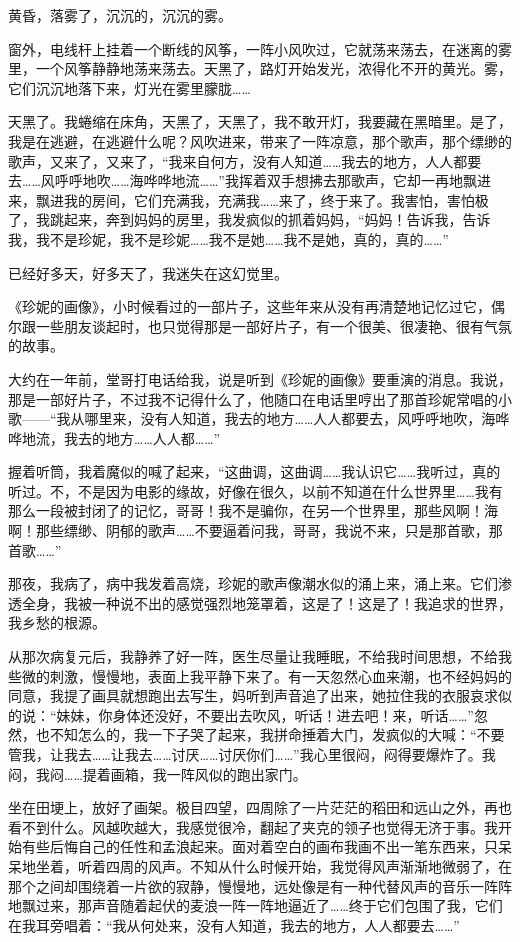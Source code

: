 \par 黄昏，落雾了，沉沉的，沉沉的雾。
\par 窗外，电线杆上挂着一个断线的风筝，一阵小风吹过，它就荡来荡去，在迷离的雾里，一个风筝静静地荡来荡去。天黑了，路灯开始发光，浓得化不开的黄光。雾，它们沉沉地落下来，灯光在雾里朦胧……
\par 天黑了。我蜷缩在床角，天黑了，天黑了，我不敢开灯，我要藏在黑暗里。是了，我是在逃避，在逃避什么呢？风吹进来，带来了一阵凉意，那个歌声，那个缥缈的歌声，又来了，又来了，“我来自何方，没有人知道……我去的地方，人人都要去……风呼呼地吹……海哗哗地流……”我挥着双手想拂去那歌声，它却一再地飘进来，飘进我的房间，它们充满我，充满我……来了，终于来了。我害怕，害怕极了，我跳起来，奔到妈妈的房里，我发疯似的抓着妈妈，“妈妈！告诉我，告诉我，我不是珍妮，我不是珍妮……我不是她……我不是她，真的，真的……”
\par 已经好多天，好多天了，我迷失在这幻觉里。
\par 《珍妮的画像》，小时候看过的一部片子，这些年来从没有再清楚地记忆过它，偶尔跟一些朋友谈起时，也只觉得那是一部好片子，有一个很美、很凄艳、很有气氛的故事。
\par 大约在一年前，堂哥打电话给我，说是听到《珍妮的画像》要重演的消息。我说，那是一部好片子，不过我不记得什么了，他随口在电话里哼出了那首珍妮常唱的小歌——“我从哪里来，没有人知道，我去的地方……人人都要去，风呼呼地吹，海哗哗地流，我去的地方……人人都……”
\par 握着听筒，我着魔似的喊了起来，“这曲调，这曲调……我认识它……我听过，真的听过。不，不是因为电影的缘故，好像在很久，以前不知道在什么世界里……我有那么一段被封闭了的记忆，哥哥！我不是骗你，在另一个世界里，那些风啊！海啊！那些缥缈、阴郁的歌声……不要逼着问我，哥哥，我说不来，只是那首歌，那首歌……”
\par 那夜，我病了，病中我发着高烧，珍妮的歌声像潮水似的涌上来，涌上来。它们渗透全身，我被一种说不出的感觉强烈地笼罩着，这是了！这是了！我追求的世界，我乡愁的根源。
\par 从那次病复元后，我静养了好一阵，医生尽量让我睡眠，不给我时间思想，不给我些微的刺激，慢慢地，表面上我平静下来了。有一天忽然心血来潮，也不经妈妈的同意，我提了画具就想跑出去写生，妈听到声音追了出来，她拉住我的衣服哀求似的说：“妹妹，你身体还没好，不要出去吹风，听话！进去吧！来，听话……”忽然，也不知怎么的，我一下子哭了起来，我拼命捶着大门，发疯似的大喊：“不要管我，让我去……让我去……讨厌……讨厌你们……”我心里很闷，闷得要爆炸了。我闷，我闷……提着画箱，我一阵风似的跑出家门。
\par 坐在田埂上，放好了画架。极目四望，四周除了一片茫茫的稻田和远山之外，再也看不到什么。风越吹越大，我感觉很冷，翻起了夹克的领子也觉得无济于事。我开始有些后悔自己的任性和孟浪起来。面对着空白的画布我画不出一笔东西来，只呆呆地坐着，听着四周的风声。不知从什么时候开始，我觉得风声渐渐地微弱了，在那个之间却围绕着一片欲的寂静，慢慢地，远处像是有一种代替风声的音乐一阵阵地飘过来，那声音随着起伏的麦浪一阵一阵地逼近了……终于它们包围了我，它们在我耳旁唱着：“我从何处来，没有人知道，我去的地方，人人都要去……”
